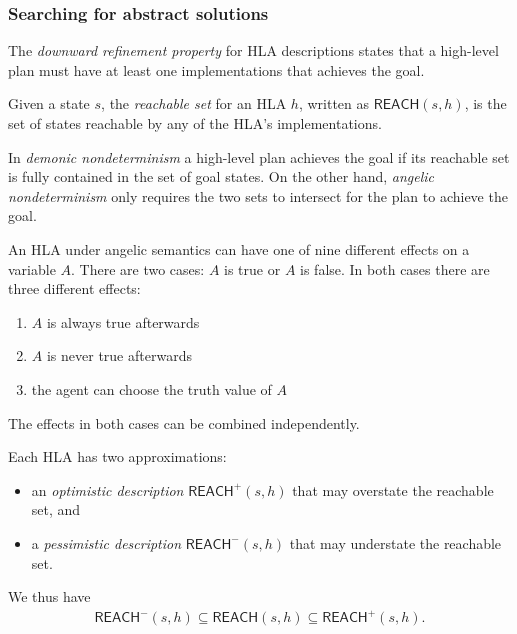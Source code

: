 \documentclass{article}
\begin{document}
\subsubsection{Searching for abstract solutions}

\begin{definition}[R\&N p. 410]
	The \emph{downward refinement property} for HLA descriptions states that
	a high-level plan must have at least one implementations that achieves the
	goal.
\end{definition}

\begin{definition}[R\&N p. 411]
	Given a state $s$, the \emph{reachable set} for an HLA $h$, written as
	$\textsf{REACH}(s,h)$, is the set of states reachable by any of the HLA's
	implementations.
\end{definition}

\begin{definition}
	In \emph{demonic nondeterminism} a high-level plan achieves the goal if
	its reachable set is fully contained in the set of goal states.
	On the other hand, \emph{angelic nondeterminism} only requires the two
	sets to intersect for the plan to achieve the goal.
\end{definition}

\begin{theorem}[R\&N p. 412]
	An HLA under angelic semantics can have one of nine different effects on
	a variable $A$. There are two cases: $A$ is true or $A$ is false. In both
	cases there are three different effects:
	\begin{enumerate}
		\item $A$ is always true afterwards
		\item $A$ is never true afterwards
		\item the agent can choose the truth value of $A$
	\end{enumerate}
	The effects in both cases can be combined independently.
\end{theorem}

\begin{definition}
	Each HLA has two approximations:
	\begin{itemize}
		\item an \emph{optimistic description} $\textsf{REACH}^+(s,h)$ that may
		      overstate the reachable set, and
		\item a \emph{pessimistic description} $\textsf{REACH}^-(s,h)$ that may
		      understate the reachable set.
	\end{itemize}
	We thus have
	\begin{align*}
		\textsf{REACH}^-(s,h) \subseteq\textsf{REACH}(s,h)\subseteq\textsf{REACH}^+(s,h).
	\end{align*}
\end{definition}
\end{document}

